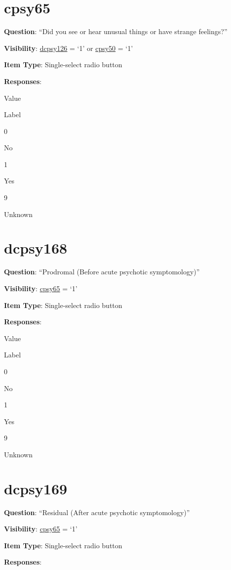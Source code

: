 \documentclass[]{book}
\begin{document}
\hypertarget{cpsy65}{%
\section{cpsy65}\label{cpsy65}}

\textbf{Question}: ``Did you see or hear unusual things or have strange feelings?''

\textbf{Visibility}: \protect\hyperlink{dcpsy126}{dcpsy126} = `1' or \protect\hyperlink{cpsy50}{cpsy50} = `1'

\textbf{Item Type}: Single-select radio button

\textbf{Responses}:

Value

Label

0

No

1

Yes

9

Unknown

\hypertarget{dcpsy168}{%
\section{dcpsy168}\label{dcpsy168}}

\textbf{Question}: ``Prodromal (Before acute psychotic symptomology)''

\textbf{Visibility}: \protect\hyperlink{cpsy65}{cpsy65} = `1'

\textbf{Item Type}: Single-select radio button

\textbf{Responses}:

Value

Label

0

No

1

Yes

9

Unknown

\hypertarget{dcpsy169}{%
\section{dcpsy169}\label{dcpsy169}}

\textbf{Question}: ``Residual (After acute psychotic symptomology)''

\textbf{Visibility}: \protect\hyperlink{cpsy65}{cpsy65} = `1'

\textbf{Item Type}: Single-select radio button

\textbf{Responses}:
\end{document}
